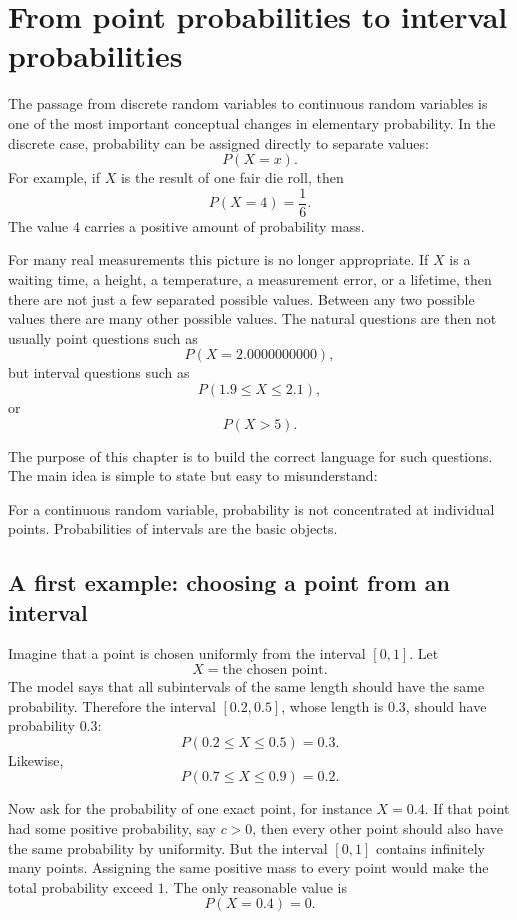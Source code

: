 \section{From point probabilities to interval probabilities}

The passage from discrete random variables to continuous random variables is one
of the most important conceptual changes in elementary probability. In the
discrete case, probability can be assigned directly to separate values:
\[
P(X=x).
\]
For example, if \(X\) is the result of one fair die roll, then
\[
P(X=4)=\frac16.
\]
The value \(4\) carries a positive amount of probability mass.

For many real measurements this picture is no longer appropriate. If \(X\) is a
waiting time, a height, a temperature, a measurement error, or a lifetime, then
there are not just a few separated possible values. Between any two possible
values there are many other possible values. The natural questions are then not
usually point questions such as
\[
P(X=2.0000000000),
\]
but interval questions such as
\[
P(1.9\leq X\leq 2.1),
\]
or
\[
P(X>5).
\]

The purpose of this chapter is to build the correct language for such questions.
The main idea is simple to state but easy to misunderstand:

\begin{summarybox}
For a continuous random variable, probability is not concentrated at individual
points. Probabilities of intervals are the basic objects.
\end{summarybox}

\subsection*{A first example: choosing a point from an interval}

Imagine that a point is chosen uniformly from the interval \([0,1]\). Let
\[
X=\text{the chosen point}.
\]
The model says that all subintervals of the same length should have the same
probability. Therefore the interval \([0.2,0.5]\), whose length is \(0.3\), should
have probability \(0.3\):
\[
P(0.2\leq X\leq 0.5)=0.3.
\]
Likewise,
\[
P(0.7\leq X\leq 0.9)=0.2.
\]

Now ask for the probability of one exact point, for instance \(X=0.4\). If that
point had some positive probability, say \(c>0\), then every other point should
also have the same probability by uniformity. But the interval \([0,1]\) contains
infinitely many points. Assigning the same positive mass to every point would
make the total probability exceed \(1\). The only reasonable value is
\[
P(X=0.4)=0.
\]

